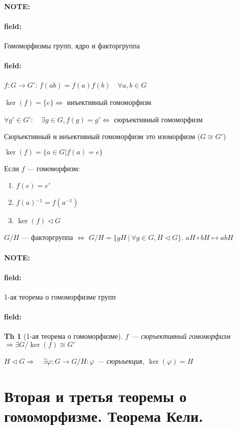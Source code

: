 \documentclass[12pt]{article}
\newenvironment{note}{\paragraph{NOTE:}}{}
\newenvironment{field}{\paragraph{field:}}{}
\newtheorem{theorem}{Th}
\begin{document}
\begin{note}
  \begin{field}
    Гомоморфизмы групп, ядро и факторгруппа
  \end{field}
  \begin{field}
    $f : G \rightarrow G'$:
    $f(ab) = f(a)f(b) \quad{} \forall a, b \in G$

    $\ker(f) = \{e\} \Leftrightarrow$ инъективный гомоморфизм

    $\forall g' \in G': \quad{} \exists g \in G, f(g) = g' \Leftrightarrow$ сюръективный гомоморфизм

    Сюръективный и инъективный гомоморфизм это изоморфизм ($G \cong G'$)

    $\ker(f) = \{ a \in G | f(a) = e \}$

    Если $f$ --- гомоморфизм:
    \begin{enumerate}
      \item
            $f(e) = e'$
      \item
            $f(a){}^{-1} = f(a^{-1})$
      \item
            $\ker(f) \vartriangleleft G$
    \end{enumerate}

    $G/H$ --- факторгруппа $\Leftrightarrow$ $G/H = \{gH \ | \ \forall g \in G, H \vartriangleleft G\}$.
    $aH \circ bH \mapsto abH$

  \end{field}
\end{note}

\begin{note}
  \begin{field}
    1-ая теорема о гомоморфизме групп
  \end{field}
  \begin{field}
    \begin{theorem}[1-ая теорема о гомоморфизме]
      $f$ --- сюръективный гомоморфизм $\Rightarrow \exists G/\ker(f) \cong G'$

      $H \vartriangleleft G \Rightarrow \quad{} \exists \varphi : G \rightarrow G/H : \varphi$ --- сюрьъекция, $\ker(\varphi) = H$
    \end{theorem}
  \end{field}
\end{note}

\section{Вторая и третья теоремы о гомоморфизме. Теорема Кели.}
\end{document}
